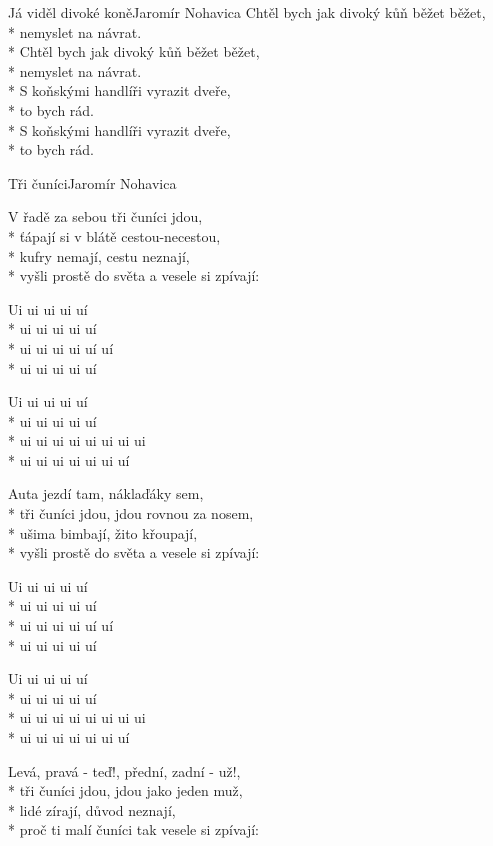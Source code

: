 \documentclass[10.5pt]{book}
\begin{document}
\begin{poem}{Já viděl divoké koně}{Jaromír Nohavica}
Chtěl bych jak divoký kůň běžet běžet,\\* 
nemyslet na návrat.\\*
Chtěl bych jak divoký kůň běžet běžet, \\*
nemyslet na návrat.\\*
S koňskými handlíři vyrazit dveře, \\*
to bych rád.\\*
S koňskými handlíři vyrazit dveře, \\*
to bych rád.

\end{poem}

\begin{poem}{Tři čuníci}{Jaromír Nohavica}

\settowidth{\versewidth}{vyšli prostě do světa a vesele si zpívají:}

V řadě za sebou tři čuníci jdou,\\*
ťápají si v blátě cestou-necestou,\\*
kufry nemají, cestu neznají,\\*
vyšli prostě do světa a vesele si zpívají: 

Ui ui ui ui uí\\*
ui ui ui ui uí\\*
ui ui ui ui uí uí\\*
ui ui ui ui uí

Ui ui ui ui uí\\*
ui ui ui ui uí\\*
ui ui ui ui ui ui ui ui\\*
ui ui ui ui ui ui uí

Auta jezdí tam, náklaďáky sem,\\*
tři čuníci jdou, jdou rovnou za nosem,\\*
ušima bimbají, žito křoupají,\\*
vyšli prostě do světa a vesele si zpívají: 

Ui ui ui ui uí\\*
ui ui ui ui uí\\*
ui ui ui ui uí uí\\*
ui ui ui ui uí

Ui ui ui ui uí\\*
ui ui ui ui uí\\*
ui ui ui ui ui ui ui ui\\*
ui ui ui ui ui ui uí

Levá, pravá - teď!, přední, zadní - už!,\\*
tři čuníci jdou, jdou jako jeden muž,\\*
lidé zírají, důvod neznají,\\*
proč ti malí čuníci tak vesele si zpívají: 


\end{poem}
\end{document}
